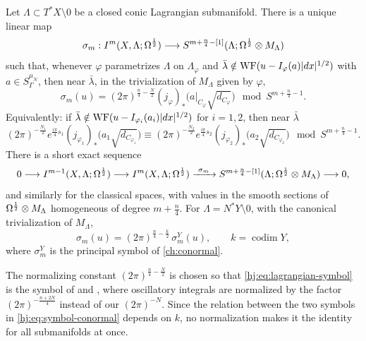 \begin{theorem}\label{hj:thm:lagrangian-symbol}
  Let $\Lambda\subset T^*X\setminus0$ be a closed conic Lagrangian submanifold.
  There is a unique linear map
  \begin{equation*}
    \sigma_m:I^{m}(X,\Lambda;\Omega^{\frac12})\longrightarrow
    S^{m+\frac n4-[1]}(\Lambda;\Omega^{\frac12}\otimes M_\Lambda)
  \end{equation*}
  such that, whenever $\varphi$ parametrizes $\Lambda$ on $\Lambda_\varphi$ and
  $\bar\lambda\notin\operatorname{WF}(u-I_\varphi(a)|dx|^{1/2})$ with $a\in S^{\mu_N}_\Gamma$,
  then near $\bar\lambda$, in the trivialization of $M_\Lambda$ given by
  $\varphi$,
  \begin{equation}\label{hj:eq:lagrangian-symbol}
    \sigma_m(u)=(2\pi)^{\frac n4-\frac N2}(j_\varphi)_*\big(a|_{C_\varphi}
    \sqrt{d_{C_\varphi}}\big)\mod S^{m+\frac n4-1}.
  \end{equation}
  Equivalently: if $\bar\lambda\notin\operatorname{WF}(u-I_{\varphi_i}(a_i)|dx|^{1/2})$ for
  $i=1,2$, then near $\bar\lambda$
  \begin{equation}\label{hj:eq:symbol-change}
    (2\pi)^{-\frac{N_1}2}e^{\frac{i\pi}4s_1}(j_{\varphi_1})_*\big(a_1\sqrt{d_{C_{\varphi_1}}}\big)
    \equiv(2\pi)^{-\frac{N_2}2}e^{\frac{i\pi}4s_2}(j_{\varphi_2})_*\big(a_2
    \sqrt{d_{C_{\varphi_2}}}\big)\mod S^{m+\frac n4-1}.
  \end{equation}
  There is a short exact sequence
  \begin{equation*}
    0\longrightarrow I^{m-1}(X,\Lambda;\Omega^{\frac12})\longrightarrow
    I^{m}(X,\Lambda;\Omega^{\frac12})\xrightarrow{\ \sigma_m\ }
    S^{m+\frac n4-[1]}(\Lambda;\Omega^{\frac12}\otimes M_\Lambda)\longrightarrow0,
  \end{equation*}
  and similarly for the classical spaces, with values in the smooth sections of
  $\Omega^{\frac12}\otimes M_\Lambda$ homogeneous of degree $m+\frac n4$.  For
  $\Lambda=N^*Y\setminus0$, with the canonical trivialization of $M_\Lambda$,
  \begin{equation}\label{hj:eq:symbol-conormal}
    \sigma_m(u)=(2\pi)^{\frac n4-\frac k2}\,\sigma^{Y}_m(u),\qquad k=\operatorname{codim}Y,
  \end{equation}
  where $\sigma^Y_m$ is the principal symbol of \cref{ch:conormal}.
\end{theorem}

The normalizing constant $(2\pi)^{\frac n4-\frac N2}$ is chosen so that
\eqref{hj:eq:lagrangian-symbol} is the symbol of \cite{Hormander-FIO} and
\cite[Section~25.1]{Hormander-IV}, where oscillatory integrals are
normalized
by the factor $(2\pi)^{-\frac{n+2N}4}$ instead of our $(2\pi)^{-N}$.  Since the
relation between the two symbols in \eqref{hj:eq:symbol-conormal} depends on
$k$, no normalization makes it the identity for all submanifolds at once.


